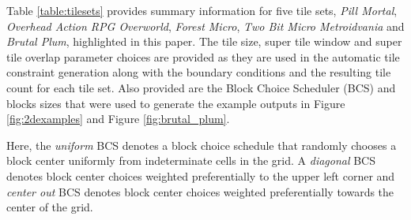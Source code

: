 

Table \ref{table:tilesets} provides summary information for five tile sets, \textit{Pill Mortal}, \textit{Overhead Action RPG Overworld},
\textit{Forest Micro}, \textit{Two Bit Micro Metroidvania} and \textit{Brutal Plum}, highlighted in this paper.
The tile size, super tile window and super tile overlap parameter choices are provided as they are used in the automatic tile constraint generation
along with the boundary conditions and the resulting tile count for each tile set.
Also provided are the Block Choice Scheduler (BCS) and blocks sizes that were used to generate the example outputs in Figure \ref{fig:2dexamples} and Figure \ref{fig:brutal_plum}.

Here, the \textit{uniform} BCS denotes a block choice schedule that randomly chooses a block center uniformly from
indeterminate cells in the grid.
A \textit{diagonal} BCS denotes block center choices weighted preferentially to the upper left corner and
\textit{center out} BCS denotes block center choices weighted preferentially towards the center of the grid.

